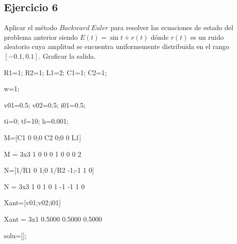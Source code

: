 \documentclass[10pt,a4paper]{article} %
\begin{document}
	
	\subsection{Ejercicio 6} Aplicar el método $Backward\ Euler$ para resolver las ecuaciones de estado del problema anterior siendo $E(t)=\sin t + r(t)$ dónde $r(t)$ es un ruido aleatorio cuya amplitud se encuentra uniformemente distribuida en el rango $[-0.1,0.1]$. Graficar la salida.\\
	
	
	\begin{matlabcode}
		R1=1;
		R2=1;
		L1=2;
		C1=1;
		C2=1;
		
		w=1;
	\end{matlabcode}
	
	
	\begin{matlabcode}
		v01=0.5;
		v02=0.5;
		i01=0.5;
	\end{matlabcode}
	
	
	\begin{matlabcode}
		ti=0;
		tf=10;
		h=0.001;
	\end{matlabcode}
	
	
	\begin{matlabcode}
		M=[C1 0 0;0 C2 0;0 0 L1]
	\end{matlabcode}
	\begin{matlaboutput}
		M = 3x3    
		1     0     0
		0     1     0
		0     0     2
		
	\end{matlaboutput}
	\begin{matlabcode}
		N=[1/R1 0 1;0 1/R2 -1;-1 1 0]
	\end{matlabcode}
	\begin{matlaboutput}
		N = 3x3    
		1     0     1
		0     1    -1
		-1     1     0
		
	\end{matlaboutput}
	\begin{matlabcode}
		Xant=[v01;v02;i01]
	\end{matlabcode}
	\begin{matlaboutput}
		Xant = 3x1    
		0.5000
		0.5000
		0.5000
		
	\end{matlaboutput}
	\begin{matlabcode}
		solu=[];
	\end{matlabcode}
	
\end{document}
